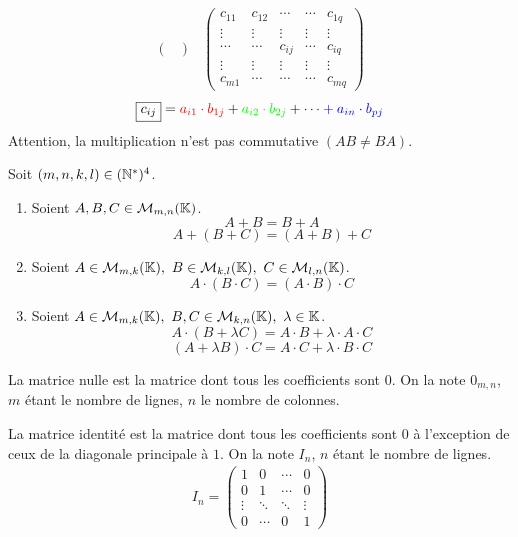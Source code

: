 \begin{definition}
\begin{enumerate}
\begin{align*}
\begin{pmatrix}
            \end{pmatrix}
            &\begin{pmatrix}
                c_{11} & c_{12} & \cdots & \cdots & c_{1q} \\
                \vdots & \vdots & \vdots & \vdots & \vdots \\
                \cdots & \cdots & \boxed{c_{ij}} & \cdots & c_{iq} \\
                \vdots & \vdots & \vdots & \vdots & \vdots \\
                c_{m1} & \cdots & \cdots & \cdots & c_{mq}
            \end{pmatrix}
        \end{align*}
        \[ \boxed{c_{ij}} = \color{red}a_{i1} \cdot b_{1j} \color{black}+ \color{green} a_{i2} \cdot b_{2j} \color{black}+ \color{blue}\cdots + a_{in} \cdot b_{pj} \]
		Attention, la multiplication n'est pas commutative $(AB \neq BA)$.
	\end{enumerate}
\end{definition}

\begin{proposition}
	Soit $(m, n, k, l) \in (\mathbb{N}^*)^4$.
	\begin{enumerate}
		\item Soient $A, B, C \in \mathcal{M}_{m,n} (\mathbb{K})$.
		\[A + B = B + A\]
		\[A + (B + C) = (A + B) + C\]
		\item Soient $A \in \mathcal{M}_{m, k}(\K),\ B \in \mathcal{M}_{k, l}(\K),\ C \in \mathcal{M}_{l, n}(\K)$.
		\[A \cdot (B \cdot C) = (A \cdot B) \cdot C\]
		\item Soient $A \in \mathcal{M}_{m, k}(\K),\ B, C \in \mathcal{M}_{k, n}(\K),\ \lambda \in \K$.
		\[A \cdot (B + \lambda C) = A \cdot B + \lambda \cdot A \cdot C\]
		\[(A + \lambda B) \cdot C = A \cdot C + \lambda \cdot B \cdot C\]
	\end{enumerate}
\end{proposition}

\begin{definition}
	La matrice nulle est la matrice dont tous les coefficients sont $0$. On la note $0_{m,n}$, $m$ étant le nombre de lignes, $n$ le nombre de colonnes. 
\end{definition}

\begin{definition}
	La matrice identité est la matrice dont tous les coefficients sont $0$ à l'exception de ceux de la diagonale principale à $1$. On la note $I_n$, $n$ étant le nombre de lignes.
	\begin{align*}
		I_n = 
		\begin{pmatrix}
			1 & 0 & \cdots & 0 \\
			0 & 1 & \cdots & 0 \\
			\vdots & \ddots & \ddots & \vdots \\
			0 & \cdots & 0 & 1
		\end{pmatrix}
	\end{align*}
\end{definition}

